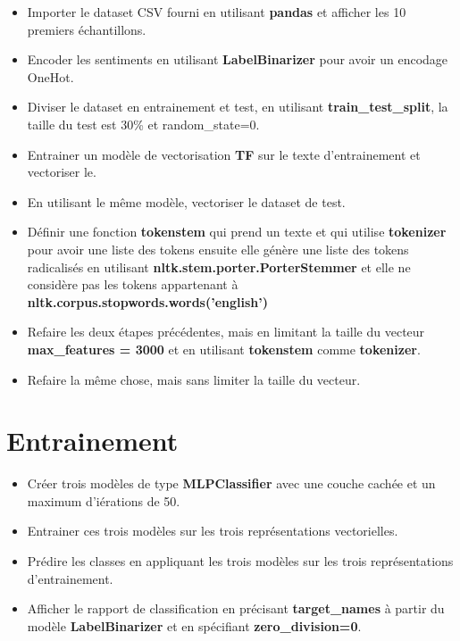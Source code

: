 \documentclass[11pt, a4paper]{article}
\begin{document}
\begin{itemize}
	\item Importer le dataset CSV fourni en utilisant \textbf{pandas} et afficher les 10 premiers échantillons.
	\item Encoder les sentiments en utilisant \textbf{LabelBinarizer} pour avoir un encodage OneHot.
	\item Diviser le dataset en entrainement et test, en utilisant \textbf{train\_test\_split}, la taille du test est 30\% et random\_state=0.
	\item Entrainer un modèle de vectorisation \textbf{TF} sur le texte d'entrainement et vectoriser le. 
	\item En utilisant le même modèle, vectoriser le dataset de test.
	\item Définir une fonction \textbf{tokenstem} qui prend un texte et qui utilise \textbf{tokenizer} pour avoir une liste des tokens ensuite elle génère une liste des tokens radicalisés en utilisant \textbf{nltk.stem.porter.PorterStemmer} et elle ne considère pas les tokens appartenant à \textbf{nltk.corpus.stopwords.words('english')}
	\item Refaire les deux étapes précédentes, mais en limitant la taille du vecteur \textbf{max\_features = 3000} et en utilisant  \textbf{tokenstem} comme \textbf{tokenizer}.
	\item Refaire la même chose, mais sans limiter la taille du vecteur.
	
\end{itemize}

\section{Entrainement}

\begin{itemize}
	\item Créer trois modèles de type \textbf{MLPClassifier} avec une couche cachée et un maximum d'iérations de 50.
	\item Entrainer ces trois modèles sur les trois représentations vectorielles.
	\item Prédire les classes en appliquant les trois modèles sur les trois représentations d'entrainement.
	\item Afficher le rapport de classification en précisant \textbf{target\_names} à partir du modèle \textbf{LabelBinarizer} et en spécifiant \textbf{zero\_division=0}.
	
\end{itemize}
\end{document}
